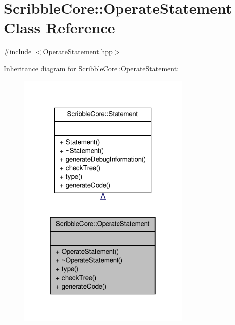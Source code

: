 \hypertarget{class_scribble_core_1_1_operate_statement}{\section{Scribble\-Core\-:\-:Operate\-Statement Class Reference}
\label{class_scribble_core_1_1_operate_statement}
}


{\ttfamily \#include $<$Operate\-Statement.\-hpp$>$}



Inheritance diagram for Scribble\-Core\-:\-:Operate\-Statement\-:
\nopagebreak
\begin{figure}[H]
\begin{center}
\leavevmode
\includegraphics[width=238pt]{class_scribble_core_1_1_operate_statement__inherit__graph}
\end{center}
\end{figure}


